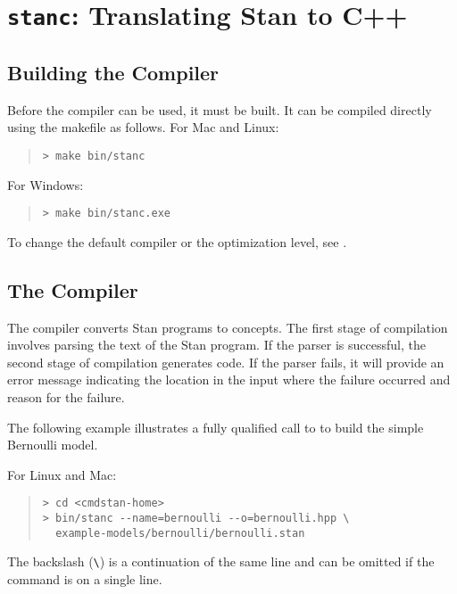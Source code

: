 \chapter{{\tt\bfseries stanc}: Translating Stan to C++}\label{stanc.chapter}

\section{Building the \stanc Compiler}

Before the \stanc compiler can be used, it must be built. It can be
compiled directly using the makefile as follows. For Mac and Linux:
%
\begin{quote}
\begin{Verbatim}[fontshape=sl]
> make bin/stanc
\end{Verbatim}
\end{quote}
%
For Windows:
%
\begin{quote}
\begin{Verbatim}[fontshape=sl]
> make bin/stanc.exe
\end{Verbatim}
\end{quote}
%
To change the default compiler or the optimization level, see
.

\section{The \stanc Compiler}

The \stanc compiler converts Stan programs to \Cpp concepts. The
first stage of compilation involves parsing the text of the Stan
program.  If the parser is successful, the second stage of compilation
generates \Cpp code.  If the parser fails, it will provide an error
message indicating the location in the input where the failure
occurred and reason for the failure.

The following example illustrates a fully qualified call to \stanc
to build the simple Bernoulli model. 

For Linux and Mac:
%
\begin{quote}
\begin{Verbatim}[fontshape=sl]
> cd <cmdstan-home>
> bin/stanc --name=bernoulli --o=bernoulli.hpp \
  example-models/bernoulli/bernoulli.stan 
\end{Verbatim}
\end{quote}
%
The backslash (\Verb|\|) is a continuation of the same line and can be
omitted if the command is on a single line.

